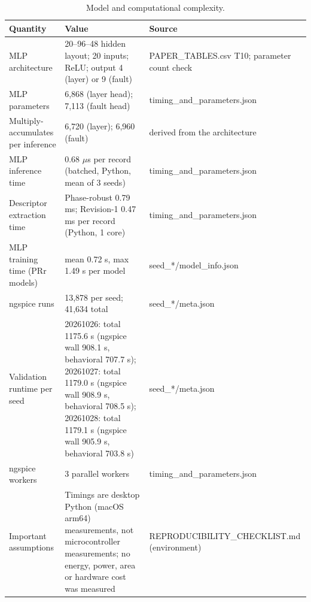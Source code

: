 \begin{table}[H]
\caption{Model and computational complexity.\label{tab:table12_complexity}}
\centering
\footnotesize
\begin{tabular}{p{3.2cm}p{5.4cm}p{5.4cm}}
\toprule
\textbf{Quantity} & \textbf{Value} & \textbf{Source} \\
\midrule
MLP architecture & 20--96--48 hidden layout; 20 inputs; ReLU; output 4 (layer) or 9 (fault) & PAPER\_TABLES.csv T10; parameter count check \\
MLP parameters & 6,868 (layer head); 7,113 (fault head) & timing\_and\_parameters.json \\
Multiply-accumulates per inference & 6,720 (layer); 6,960 (fault) & derived from the architecture \\
MLP inference time & 0.68 $\mu$s per record (batched, Python, mean of 3 seeds) & timing\_and\_parameters.json \\
Descriptor extraction time & Phase-robust 0.79 ms; Revision-1 0.47 ms per record (Python, 1 core) & timing\_and\_parameters.json \\
MLP training time (PRr models) & mean 0.72 s, max 1.49 s per model & seed\_*/model\_info.json \\
ngspice runs & 13,878 per seed; 41,634 total & seed\_*/meta.json \\
Validation runtime per seed & 20261026: total 1175.6 s (ngspice wall 908.1 s, behavioral 707.7 s); 20261027: total 1179.0 s (ngspice wall 908.9 s, behavioral 708.5 s); 20261028: total 1179.1 s (ngspice wall 905.9 s, behavioral 703.8 s) & seed\_*/meta.json \\
ngspice workers & 3 parallel workers & timing\_and\_parameters.json \\
Important assumptions & Timings are desktop Python (macOS arm64) measurements, not microcontroller measurements; no energy, power, area or hardware cost was measured & REPRODUCIBILITY\_CHECKLIST.md (environment) \\
\bottomrule
\end{tabular}
\par\vspace{2pt}
\end{table}

